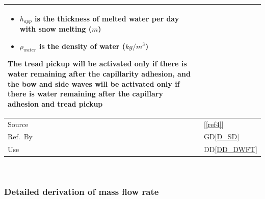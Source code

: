 \documentclass[12pt]{article}
\newcommand{\colAwidth}{0.13\textwidth}
\newcommand{\colBwidth}{0.82\textwidth}
\newcommand{\dref}[1]{GD\ref{#1}}
\newcommand{\ddref}[1]{DD\ref{#1}}
\newcommand{\reref}[1]{\ref{#1}}
\begin{document}
\begin{minipage}{\textwidth}
\begin{tabular}{| p{\colAwidth} | p{\colBwidth}|}
\begin{itemize}
\item $h_{app}$ is the thickness of melted water per day with snow melting ($m$)

\item $\rho_{water}$ is the density of water ($kg/m^{3}$)

\end{itemize}

The tread pickup will be activated only if there is water remaining after the capillarity adhesion, and the bow and side waves will be activated only if there is water remaining after the capillary adhesion and tread pickup
\\
\hline
  Source & [\reref{ref4}] \\
  \hline
  Ref.\ By & \dref{D_SD} \\ %
  \hline
  Use\ & \ddref{DD_DWFT}\\
  \hline
\end{tabular}

\end{minipage}\\


\subsubsection*{Detailed derivation of mass flow rate}
\end{document}
